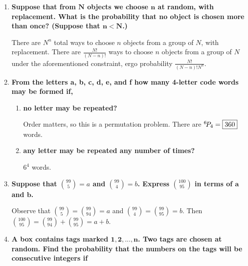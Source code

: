 \documentclass[10pt, oneside]{article}
\begin{document}
\begin{enumerate}[label=2.\arabic*]
\begin{enumerate}
	\end{enumerate}
\item \begin{tcolorbox}[
  colback=Cerulean!5!white,
  colframe=Cerulean!75!black]
  \textbf{Suppose that from $\bm{N}$ objects we choose $\bm{n}$ at random, with replacement. What is the probability that no object is chosen more than once? (Suppose that $\bm{n < N}$.)}
  \end{tcolorbox}
  
  There are $N^n$ total ways to choose $n$ objects from a group of $N$, with replacement. There are $\frac{N!}{(N-n)!}$ ways to choose $n$ objects from a group of $N$ under the aforementioned constraint, ergo probability $\boxed{ \frac{N!}{(N-n)! N^n }} $.
\item \begin{tcolorbox}[
  colback=Cerulean!5!white,
  colframe=Cerulean!75!black]
  \textbf{From the letters a, b, c, d, e, and f how many 4-letter code words may be formed if,}
  \end{tcolorbox}
  
  	\begin{enumerate}
	\item \begin{tcolorbox}[
  colback=Cerulean!5!white,
  colframe=Cerulean!75!black]
  \textbf{no letter may be repeated?}
  \end{tcolorbox}
  
  Order matters, so this is a permutation problem. There are ${}^{6}\!P_{4} = \boxed{360}$ words.
  	\item \begin{tcolorbox}[
  colback=Cerulean!5!white,
  colframe=Cerulean!75!black]
  \textbf{any letter may be repeated any number of times?}
  \end{tcolorbox}
  
  $\boxed{6^4}$ words.
	\end{enumerate}
\item \begin{tcolorbox}[
  colback=Cerulean!5!white,
  colframe=Cerulean!75!black]
  \textbf{Suppose that $\binom{99}{5} = a$ and $ \binom{99}{4} = b$. Express $\binom{100}{95} $ in terms of $\bm{a}$ and $\bm{b}$.}
  \end{tcolorbox}
  
  Observe that $\binom{99}{5} = \binom{99}{94} = a$ and $\binom{99}{4} = \binom{99}{95} = b$. Then $\binom{100}{95} = \binom{99}{94} + \binom{99}{95} = \boxed{a + b}$.
\item \begin{tcolorbox}[
  colback=Cerulean!5!white,
  colframe=Cerulean!75!black]
  \textbf{A box contains tags marked $\bm{1, 2, ..., n}$. Two tags are chosen at random. Find the probability that the numbers on the tags will be consecutive integers if}
  \end{tcolorbox}
  

\end{enumerate}
\end{document}
